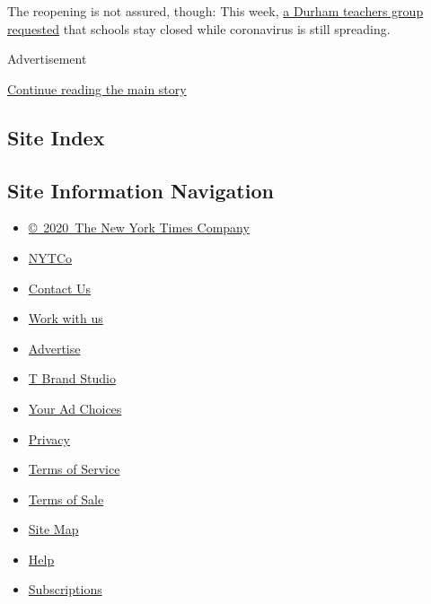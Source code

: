 The reopening is not assured, though: This week,
\href{https://daenc.com/2020/07/13/statement-on-school-re-open-plans/}{a
Durham teachers group requested} that schools stay closed while
coronavirus is still spreading.

Advertisement

\protect\hyperlink{after-bottom}{Continue reading the main story}

\hypertarget{site-index}{%
\subsection{Site Index}\label{site-index}}

\hypertarget{site-information-navigation}{%
\subsection{Site Information
Navigation}\label{site-information-navigation}}

\begin{itemize}
\tightlist
\item
  \href{https://help.nytimes3xbfgragh.onion/hc/en-us/articles/115014792127-Copyright-notice}{©~2020~The
  New York Times Company}
\end{itemize}

\begin{itemize}
\tightlist
\item
  \href{https://www.nytco.com/}{NYTCo}
\item
  \href{https://help.nytimes3xbfgragh.onion/hc/en-us/articles/115015385887-Contact-Us}{Contact
  Us}
\item
  \href{https://www.nytco.com/careers/}{Work with us}
\item
  \href{https://nytmediakit.com/}{Advertise}
\item
  \href{http://www.tbrandstudio.com/}{T Brand Studio}
\item
  \href{https://www.nytimes3xbfgragh.onion/privacy/cookie-policy\#how-do-i-manage-trackers}{Your
  Ad Choices}
\item
  \href{https://www.nytimes3xbfgragh.onion/privacy}{Privacy}
\item
  \href{https://help.nytimes3xbfgragh.onion/hc/en-us/articles/115014893428-Terms-of-service}{Terms
  of Service}
\item
  \href{https://help.nytimes3xbfgragh.onion/hc/en-us/articles/115014893968-Terms-of-sale}{Terms
  of Sale}
\item
  \href{https://spiderbites.nytimes3xbfgragh.onion}{Site Map}
\item
  \href{https://help.nytimes3xbfgragh.onion/hc/en-us}{Help}
\item
  \href{https://www.nytimes3xbfgragh.onion/subscription?campaignId=37WXW}{Subscriptions}
\end{itemize}

